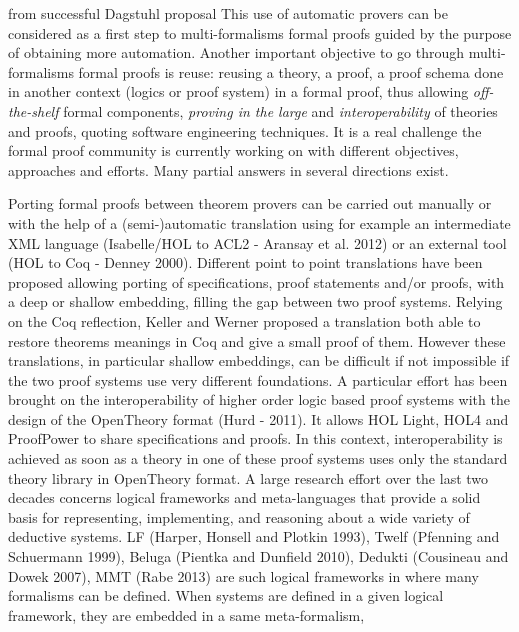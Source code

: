 \begin{oldpart}{from successful Dagstuhl proposal}
This use of automatic provers can be considered as a first step to 
multi-formalisms formal proofs guided by the purpose of obtaining more
automation. Another important objective to go through multi-formalisms
formal proofs is reuse: reusing a theory, a proof, a proof schema done
in another context (logics or proof system) in a formal proof, thus allowing
\emph{off-the-shelf} formal components, \emph{proving in the large} and 
\emph{interoperability} of theories and proofs, quoting software 
engineering techniques. It is a real challenge the formal proof
community is currently working on with different
objectives, approaches and efforts. Many partial answers in several
directions exist. 

Porting formal proofs between theorem provers can be
carried out manually or with the help of a (semi-)automatic
translation using for example an 
intermediate XML language  (Isabelle/HOL to ACL2 -
Aransay et al. 2012)  or an external tool (HOL to Coq - Denney 2000). 
Different point to point translations have been proposed allowing
 porting of specifications, proof statements and/or proofs, with a
 deep or shallow embedding, filling the gap between two proof
 systems. Relying on the Coq reflection,  Keller and Werner proposed a
 translation both able to restore theorems meanings in Coq and give a
 small proof of them. However these translations, in particular shallow embeddings,  can be difficult if not impossible if the two proof
 systems use very different foundations.
A particular effort has been brought on the interoperability of
 higher order logic based proof systems with  the design of the OpenTheory format (Hurd - 2011). It allows HOL Light, HOL4 and
 ProofPower to share specifications and proofs. In this context,  
interoperability is achieved as soon as a theory in one of these proof
 systems uses only the standard theory library in OpenTheory
 format. A large research effort over the last two decades concerns
 logical frameworks and meta-languages that provide a solid basis
for representing, implementing, and reasoning about a wide variety of
deductive systems. LF (Harper, Honsell and Plotkin 1993), Twelf
 (Pfenning and Schuermann 1999), Beluga (Pientka and Dunfield 2010),
 Dedukti (Cousineau and Dowek 2007), MMT (Rabe 2013) are such logical frameworks in where many formalisms can be defined.  When systems are defined in a given logical framework, they are embedded in a same meta-formalism,

\end{oldpart}
